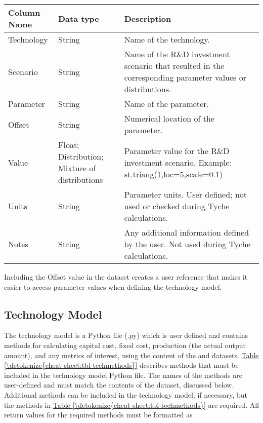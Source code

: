 \documentclass[letterpaper,10pt,english]{sphinxmanual}
\begin{document}
\begin{savenotes}\sphinxattablestart
\centering
{}
\sphinxthecaptionisattop
{}\label{\detokenize{cheat-sheet:table-3}}\label{\detokenize{cheat-sheet:tbl-paramsdict}}
\sphinxaftertopcaption
\begin{tabulary}{\linewidth}[t]{|T|T|T|}
\hline
\sphinxstyletheadfamily 
Column Name
&\sphinxstyletheadfamily 
Data type
&\sphinxstyletheadfamily 
Description
\\
\hline
Technology
&
String
&
Name of the technology.
\\
\hline
Scenario
&
String
&
Name of the R\&D investment scenario that resulted in the corresponding parameter values or distributions.
\\
\hline
Parameter
&
String
&
Name of the parameter.
\\
\hline
Offset
&
String
&
Numerical location of the parameter.
\\
\hline
Value
&
Float; Distribution; Mixture of distributions
&
Parameter value for the R\&D investment scenario. Example: st.triang(1,loc=5,scale=0.1)
\\
\hline
Units
&
String
&
Parameter units. User defined; not used or checked during Tyche calculations.
\\
\hline
Notes
&
String
&
Any additional information defined by the user. Not used during Tyche calculations.
\\
\hline
\end{tabulary}
\par
\sphinxattableend\end{savenotes}

Including the Offset value in the  dataset creates a user reference that makes it easier to access parameter values when defining the technology model.


\subsection{Technology Model}
\label{\detokenize{cheat-sheet:technology-model}}
The technology model is a Python file (.py) which is user defined and contains methods for calculating capital cost, fixed cost, production (the actual output amount), and any metrics of interest, using the content of the  and  datasets. \hyperref[\detokenize{cheat-sheet:tbl-techmethods}]{Table \ref{\detokenize{cheat-sheet:tbl-techmethods}}} describes methods that must be included in the technology model Python file. The names of the methods are user-defined and must match the contents of the  dataset, discussed below. Additional methods can be included in the technology model, if necessary, but the methods in \hyperref[\detokenize{cheat-sheet:tbl-techmethods}]{Table \ref{\detokenize{cheat-sheet:tbl-techmethods}}} are required. All return values for the required methods must be formatted as 
\end{document}
